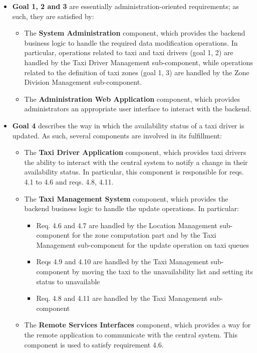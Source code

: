 \begin{itemize}
	\item \textbf{Goal 1, 2 and 3} are essentially administration-oriented requirements; as such, they are satisfied by:
	\begin{itemize}
	\item The \textbf{System Administration} component, which provides the backend business logic to handle the required data modification operations. In particular, operations related to taxi and taxi drivers (goal 1, 2) are handled by the Taxi Driver Management sub-component, while operations related to the definition of taxi zones (goal 1, 3) are handled by the Zone Division Management sub-component.
	\item The \textbf{Administration Web Application} component, which provides administrators an appropriate user interface to interact with the backend.
	\end{itemize}
	\item \textbf{Goal 4} describes the way in which the availability status of a taxi driver is updated. As such, several components are involved in its fulfillment:
	\begin{itemize}
	\item The \textbf{Taxi Driver Application} component, which provides taxi drivers the ability to interact with the central system to notify a change in their availability status. In particular, this component is responsible for reqs. 4.1 to 4.6 and reqs. 4.8, 4.11.
	\item The \textbf{Taxi Management System} component, which provides the backend business logic to handle the update operations. In particular:
	\begin{itemize}
	\item Req. 4.6 and 4.7 are handled by the Location Management sub-component for the zone computation part and by the Taxi Management sub-component for the update operation on taxi queues
	\item Reqs 4.9 and 4.10 are handled by the Taxi Management sub-component by moving the taxi to the unavailability list and setting its status to unavailable
	\item Req. 4.8 and 4.11 are handled by the Taxi Management sub-component
	\end{itemize}
	\item The \textbf{Remote Services Interfaces} component, which provides a way for the remote application to communicate with the central system. This component is used to satisfy requirement 4.6.

\end{itemize}
\end{itemize}
